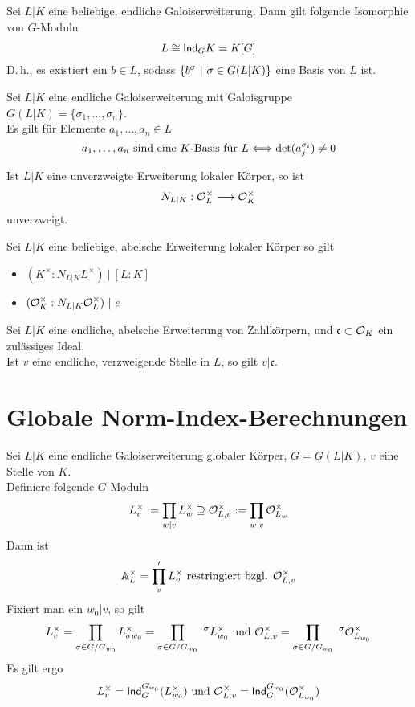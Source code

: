 \documentclass{book}
\renewcommand{\A}{\mathbb{A}}
\newcommand{\cf}{\mathfrak{c}}
\begin{document}
Sei $L|K$ eine beliebige, endliche Galoiserweiterung. Dann gilt folgende Isomorphie von $G$-Moduln
\[ L \overset{}{\cong} \textsf{Ind}_GK = K[G] \]
D.\,h., es existiert ein $b \in L$, sodass $\set{b^\sigma}{\sigma \in G(L|K)}$ eine Basis von $L$ ist.

\Lem{}
Sei $L|K$ eine endliche Galoiserweiterung mit Galoisgruppe $G(L|K) = \{\sigma_1, \ldots, \sigma_n\}$.\\
Es gilt für Elemente $a_1,\ldots, a_n \in L$
\[ a_1,\ldots, a_n \text{ sind eine }K\text{-Basis für }L \overset{}{\Longleftrightarrow} \det(a_j^{\sigma_i}) \neq 0 \]

\Kor{}
Ist $L|K$ eine unverzweigte Erweiterung lokaler Körper, so ist
\[ N_{L|K} : \mathcal{O}_L^\times \overset{}{\longrightarrow} \mathcal{O}_K^\times \]
unverzweigt.

\Kor{}
Sei $L|K$ eine beliebige, abelsche Erweiterung lokaler Körper so gilt
\begin{itemize}
\item $(K^\times : N_{L|K} L^\times ) ~|~ [L:K]$
\item $(\mathcal{O}_K^\times : N_{L|K} \mathcal{O}_L^\times ) ~|~ e$
\end{itemize}

\Bem{}
Sei $L|K$ eine endliche, abelsche Erweiterung von Zahlkörpern, und $\cf \subset \O_K$ ein zulässiges Ideal.\\
Ist $v$ eine endliche, verzweigende Stelle in $L$, so gilt $v | \cf$.

\section{Globale Norm-Index-Berechnungen}
\Def{}
Sei $L|K$ eine endliche Galoiserweiterung globaler Körper, $G = G(L|K)$, $v$ eine Stelle von $K$.\\
Definiere folgende $G$-Moduln
\[ L_v^\times := \prod_{w|v} L_w^\times \supseteq \mathcal{O}_{L,v}^\times := \prod_{w|v}\mathcal{O}_{L_w}^\times \]
Dann ist
\[ \A_L^\times = \prod'_vL_v^\times \text{ restringiert bzgl. } \O_{L,v}^\times  \]
Fixiert man ein $w_0|v$, so gilt
\[ L_v^\times = \prod_{\sigma \in G/G_{w_0}} L_{\sigma w_0}^\times = \prod_{\sigma \in G/G_{w_0}} \ ^\sigma L_{w_0}^\times \text{ und } \O_{L,v}^\times = \prod_{\sigma \in G/G_{w_0}} \ ^\sigma \O_{L_{w_0}}^\times \]
Es gilt ergo
\[ L^\times_v = \textsf{Ind}_G^{G_{w_0}} (L_{w_0}^\times) \text{ und } \mathcal{O}^\times_{L, v} = \textsf{Ind}_G^{G_{w_0}} (\mathcal{O}_{L_{w_0}}^\times) \]
\end{document}
